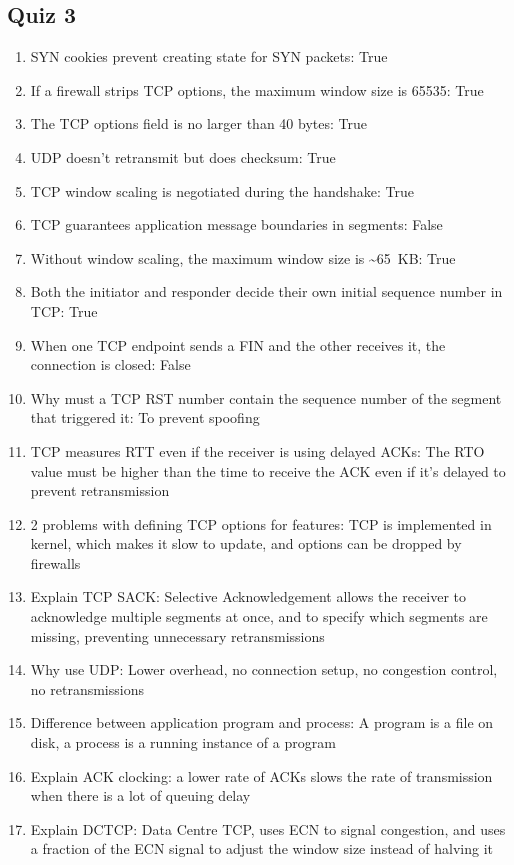\subsection{Quiz 3}
\begin{enumerate}
	\itemsep-0.5em
	\item SYN cookies prevent creating state for SYN packets: True
	\item If a firewall strips TCP options, the maximum window size is 65535: True
	\item The TCP options field is no larger than 40 bytes: True
	\item UDP doesn't retransmit but does checksum: True
	\item TCP window scaling is negotiated during the handshake: True
	\item TCP guarantees application message boundaries in segments: False
	\item Without window scaling, the maximum window size is \textasciitilde 65 KB: True
	\item Both the initiator and responder decide their own initial sequence number in TCP: True
	\item When one TCP endpoint sends a FIN and the other receives it, the connection is closed: False
	\item Why must a TCP RST number contain the sequence number of the segment that triggered it: To prevent spoofing
	\item TCP measures RTT even if the receiver is using delayed ACKs: The RTO value must be higher than the time to receive the ACK even if it's delayed to prevent retransmission
	\item 2 problems with defining TCP options for features: TCP is implemented in kernel, which makes it slow to update, and options can be dropped by firewalls
	\item Explain TCP SACK: Selective Acknowledgement allows the receiver to acknowledge multiple segments at once, and to specify which segments are missing, preventing unnecessary retransmissions
	\item Why use UDP: Lower overhead, no connection setup, no congestion control, no retransmissions
	\item Difference between application program and process: A program is a file on disk, a process is a running instance of a program
	\item Explain ACK clocking: a lower rate of ACKs slows the rate of transmission when there is a lot of queuing delay
	\item Explain DCTCP: Data Centre TCP, uses ECN to signal congestion, and uses a fraction of the ECN signal to adjust the window size instead of halving it
\end{enumerate}

